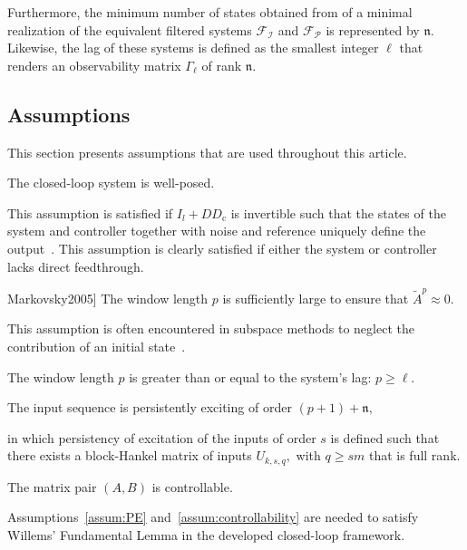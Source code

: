 Furthermore, the minimum number of states obtained from of a minimal realization of the equivalent filtered systems $\mathcal{F}_\mathcal{I}$ and $\mathcal{F}_\mathcal{P}$ is represented by $\mathfrak{n}$. Likewise, the lag of these systems is defined as the smallest integer $\ell$ that renders an observability matrix $\Gamma_\ell$ of rank $\mathfrak{n}$.

\subsection{Assumptions}
This section presents assumptions that are used throughout this article.
\begin{assum}\label{assum:well_posed}
    The closed-loop system is well-posed.
\end{assum}
This assumption is satisfied if $I_l+DD_\mathrm{c}$ is invertible such that the states of the system and controller together with noise and reference uniquely define the output~\citep{VanOverschee1997}. This assumption is clearly satisfied if either the system or controller lacks direct feedthrough.
\begin{assum}[\cite[Lemma 1]{Markovsky2005}]\label{assum:initial_contribution}
    The window length $p$ is sufficiently large to ensure that $\tilde{A}^p\approx0$.
\end{assum}
This assumption is often encountered in subspace methods to neglect the contribution of an initial state~\citep{Chiuso2007}.
\begin{assum}\label{assum:unique_initial}
    The window length $p$ is greater than or equal to the system's lag: $p\geq\ell$.
\end{assum}
\begin{assum}\label{assum:PE}
    The input sequence is persistently exciting of order $(p+1)+\mathfrak{n},$
\end{assum}
in which persistency of excitation of the inputs of order $s$ is defined such that there exists a block-Hankel matrix of inputs $U_{k,s,q},$ with $q\geq sm$ that is full rank.
\begin{assum}\label{assum:controllability}
    The matrix pair $(A,B)$ is controllable.
\end{assum}
Assumptions~\ref{assum:PE} and~\ref{assum:controllability} are needed to satisfy Willems' Fundamental Lemma in the developed closed-loop framework.